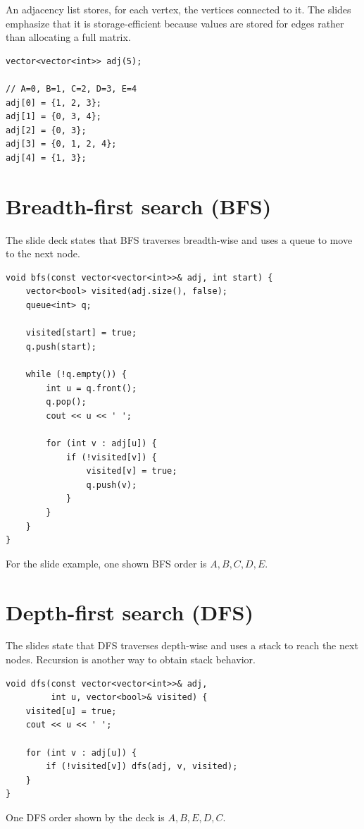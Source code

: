 An adjacency list stores, for each vertex, the vertices connected to it. The slides emphasize that it is storage-efficient because values are stored for edges rather than allocating a full matrix.

\begin{lstlisting}
vector<vector<int>> adj(5);

// A=0, B=1, C=2, D=3, E=4
adj[0] = {1, 2, 3};
adj[1] = {0, 3, 4};
adj[2] = {0, 3};
adj[3] = {0, 1, 2, 4};
adj[4] = {1, 3};
\end{lstlisting}

\section{Breadth-first search (BFS)}

The slide deck states that BFS traverses breadth-wise and uses a queue to move to the next node.

\begin{lstlisting}
void bfs(const vector<vector<int>>& adj, int start) {
    vector<bool> visited(adj.size(), false);
    queue<int> q;

    visited[start] = true;
    q.push(start);

    while (!q.empty()) {
        int u = q.front();
        q.pop();
        cout << u << ' ';

        for (int v : adj[u]) {
            if (!visited[v]) {
                visited[v] = true;
                q.push(v);
            }
        }
    }
}
\end{lstlisting}

For the slide example, one shown BFS order is $A,B,C,D,E$.

\section{Depth-first search (DFS)}

The slides state that DFS traverses depth-wise and uses a stack to reach the next nodes. Recursion is another way to obtain stack behavior.

\begin{lstlisting}
void dfs(const vector<vector<int>>& adj,
         int u, vector<bool>& visited) {
    visited[u] = true;
    cout << u << ' ';

    for (int v : adj[u]) {
        if (!visited[v]) dfs(adj, v, visited);
    }
}
\end{lstlisting}

One DFS order shown by the deck is $A,B,E,D,C$.

